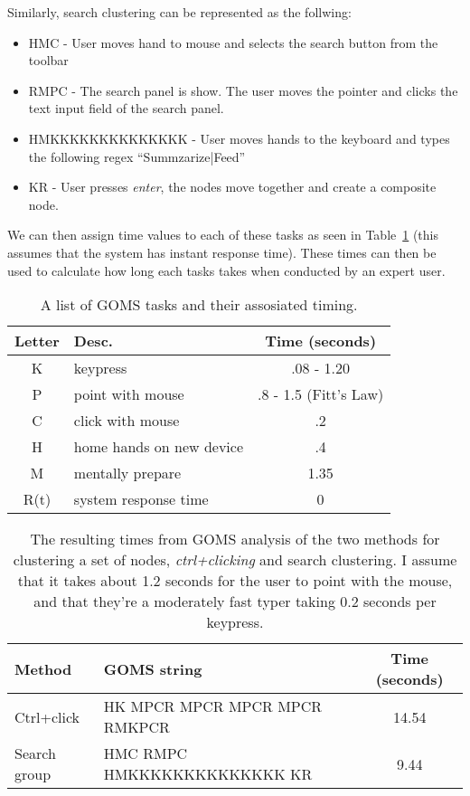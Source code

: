 Similarly, search clustering can be represented as the follwing: 

\begin{itemize}
\item HMC - User moves hand to mouse and selects the search button from the toolbar
\item RMPC - The search panel is show. The user moves the pointer and clicks the text input field of the search panel.
\item HMKKKKKKKKKKKKKK - User moves hands to the keyboard and types the following regex ``Summzarize|Feed''
\item KR - User presses \textit{enter}, the nodes move together and create a composite node.
\end{itemize}

We can then assign time values to each of these tasks as seen in Table~\ref{tab:goms-times} (this assumes that the system has instant response time). These times can then be used to calculate how long each tasks takes when conducted by an expert user.

\begin{table}[h]
	\centering
		\def\arraystretch{1.5}
	\caption{A list of GOMS tasks and their assosiated timing.}
	\label{tab:goms-times}
	\begin{tabular}{| c | l | c |}
		\hline
		\textbf{Letter} & \textbf{Desc.} & \textbf{Time (seconds)} \\
		\hline
		\hline
		K & keypress & .08 - 1.20 \\
		P & point with mouse & .8 - 1.5 (Fitt's Law) \\
		C & click with mouse & .2 \\
		H & home hands on new device & .4 \\
		M & mentally prepare & 1.35 \\
		R(t) & system response time & 0 \\
		\hline
	\end{tabular}
\end{table}

\begin{table}[h]
	\centering
		\def\arraystretch{1.5}
	\caption{The resulting times from GOMS analysis of the two methods for clustering a set of nodes, \textit{ctrl+clicking} and search clustering. I assume that it takes about 1.2 seconds for the user to point with the mouse, and that they're a moderately fast typer taking 0.2 seconds per keypress.}
	\label{tab:goms-results}
	\begin{tabular}{| l | l | c |}
		\hline
		\textbf{Method} & \textbf{GOMS string} & \textbf{Time (seconds)} \\
		\hline
		\hline
		Ctrl+click & HK MPCR MPCR MPCR MPCR RMKPCR & 14.54 \\
		Search group & HMC RMPC HMKKKKKKKKKKKKKK KR & 9.44 \\
		\hline
	\end{tabular}
\end{table}

